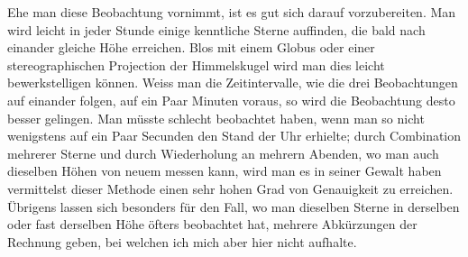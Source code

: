 Ehe man diese Beobachtung vornimmt, ist es gut sich darauf vorzubereiten.
Man wird leicht in jeder Stunde einige kenntliche Sterne auffinden, die
bald nach einander gleiche Höhe erreichen. Blos mit einem Globus oder einer
stereographischen Projection der Himmelskugel wird man dies leicht bewerkstelligen
können. Weiss man die Zeitintervalle, wie die drei Beobachtungen auf
einander folgen, auf ein Paar Minuten voraus, so wird die Beobachtung desto
besser gelingen. Man müsste schlecht beobachtet haben, wenn man so nicht wenigstens
auf ein Paar Secunden den Stand der Uhr erhielte; durch Combination
mehrerer Sterne und durch Wiederholung an mehrern Abenden, wo man auch
dieselben Höhen von neuem messen kann, wird man es in seiner Gewalt haben
vermittelst dieser Methode einen sehr hohen Grad von Genauigkeit zu erreichen.
Übrigens lassen sich besonders für den Fall, wo man dieselben Sterne in derselben
oder fast derselben Höhe öfters beobachtet hat, mehrere Abkürzungen der
Rechnung geben, bei welchen ich mich aber hier nicht aufhalte.

